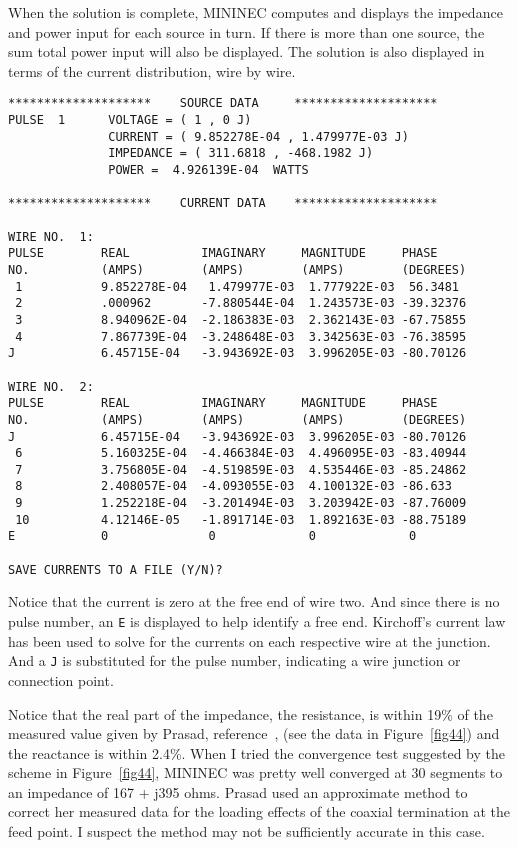 \documentclass[12pt]{article}
\begin{document}
When the solution is complete, MININEC computes and displays the
impedance and power input for each source in turn. If there is more than
one source, the sum total power input will also be displayed. The
solution is also displayed in terms of the current distribution, wire by
wire.

\begin{Verbatim}
********************    SOURCE DATA     ********************
PULSE  1      VOLTAGE = ( 1 , 0 J)
              CURRENT = ( 9.852278E-04 , 1.479977E-03 J)
              IMPEDANCE = ( 311.6818 , -468.1982 J)
              POWER =  4.926139E-04  WATTS

********************    CURRENT DATA    ********************

WIRE NO.  1:
PULSE        REAL          IMAGINARY     MAGNITUDE     PHASE
NO.          (AMPS)        (AMPS)        (AMPS)        (DEGREES)
 1           9.852278E-04   1.479977E-03  1.777922E-03  56.3481
 2           .000962       -7.880544E-04  1.243573E-03 -39.32376
 3           8.940962E-04  -2.186383E-03  2.362143E-03 -67.75855
 4           7.867739E-04  -3.248648E-03  3.342563E-03 -76.38595
J            6.45715E-04   -3.943692E-03  3.996205E-03 -80.70126

WIRE NO.  2:
PULSE        REAL          IMAGINARY     MAGNITUDE     PHASE
NO.          (AMPS)        (AMPS)        (AMPS)        (DEGREES)
J            6.45715E-04   -3.943692E-03  3.996205E-03 -80.70126
 6           5.160325E-04  -4.466384E-03  4.496095E-03 -83.40944
 7           3.756805E-04  -4.519859E-03  4.535446E-03 -85.24862
 8           2.408057E-04  -4.093055E-03  4.100132E-03 -86.633
 9           1.252218E-04  -3.201494E-03  3.203942E-03 -87.76009
 10          4.12146E-05   -1.891714E-03  1.892163E-03 -88.75189
E            0              0             0             0

SAVE CURRENTS TO A FILE (Y/N)?
\end{Verbatim}

Notice that the current is zero at the free end of wire two. And since
there is no pulse number, an \verb+E+ is displayed to help identify a
free end. Kirchoff's current law has been used to solve for the currents
on each respective wire at the junction. And a \verb+J+ is substituted
for the pulse number, indicating a wire junction or connection point.

Notice that the real part of the impedance, the resistance, is within
19\% of the measured value given by Prasad, reference~\cite{r18}, (see
the data in Figure~\ref{fig44}) and the reactance is within 2.4\%. When
I tried the convergence test suggested by the scheme in Figure~\ref{fig44},
MININEC was pretty well converged at 30 segments to an impedance of
167 + j395 ohms. Prasad used an approximate method to correct her
measured data for the loading effects of the coaxial termination at the
feed point. I suspect the method may not be sufficiently accurate in
this case.
\end{document}
